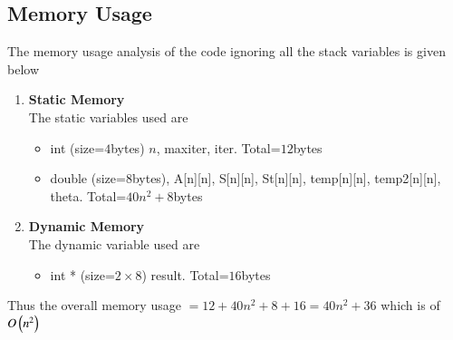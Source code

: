 \documentclass[journal,12pt,onecolumn]{IEEEtran}
\theoremstyle{remark}
\begin{document}
\subsection{\textbf{Memory Usage}}
The memory usage analysis of the code ignoring all the stack variables is given below\\
\begin{enumerate}
    \item \textbf{Static Memory}\\
    The static variables used are 
    \begin{itemize}
        \item int (size=$4$bytes) $n$, max\textunderscore iter, iter. Total=$12$bytes
        \item double (size=$8$bytes), A[n][n], S[n][n], St[n][n], temp[n][n], temp2[n][n], theta. Total=$40n^2+8$bytes
    \end{itemize}
    \item \textbf{Dynamic Memory}\\
    The dynamic variable used are 
    \begin{itemize}
        \item  int  * (size=$2 \times 8$) result. Total=$16$bytes
    \end{itemize}
\end{enumerate}
Thus the overall memory usage $=12+40n^2+8+16=40n^2+36$ which is of $O\left(n^2\right)$
\end{document}
